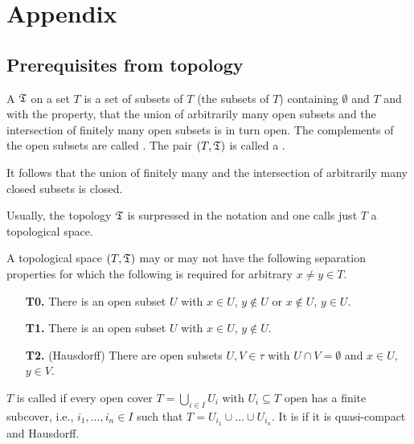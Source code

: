 \documentclass[a4paper,parskip=half,numbers=enddot, DIV=12]{scrreprt}
\begin{document}
	\appendix
	\chapter{Appendix}
	\setcounter{thm}{0}
	\renewcommand*{\thethm}{\Alph{thm}}
	\section{Prerequisites from topology}
	\begin{defi}
		A  $\mathfrak{T}$ on a set $T$ is a set of subsets of $T$ (the  subsets of $T$) containing $\emptyset$ and $T$ and with the property, that the union of arbitrarily many open subsets and the intersection of finitely many open subsets is in turn open. The complements of the open subsets are called . The pair $(T,\mathfrak{T})$ is called a .
	\end{defi}
	\begin{rem*}
		\begin{alphanumerate}
			\item It follows that the union of finitely many and the intersection of arbitrarily many closed subsets is closed.
			\item Usually, the topology $\mathfrak{T}$ is surpressed in the notation and one calls just $T$ a topological space.
		\end{alphanumerate}
	\end{rem*}
	\begin{defi}
		A topological space $(T,\mathfrak{T})$ may or may not have the following separation properties for which the following is required for arbitrary $x\neq y\in T$.
		\begin{itemize}
			\item [\textbf{T0.}] There is an open subset $U$ with $x\in U$, $y\not\in U$ or $x\not\in U$, $y\in U$.
			\item[\textbf{T1.}] There is an open subset $U$ with $x\in U$, $y\not\in U$.
			\item[\textbf{T2.}](Hausdorff) There are open subsets $U,V\in\tau$ with $U\cap V =\emptyset$ and $x\in U$, $y\in V$. 
		\end{itemize}
	\end{defi}
	\begin{defi}[Compactness]
		$T$ is called  if every open cover $T=\bigcup_{i\in I}U_i$ with $U_i\subseteq T$ open has a finite subcover, i.e., $i_1,\ldots,i_n\in I$ such that $T=U_{i_1}\cup\ldots\cup U_{i_n}$. It is  if it is quasi-compact and Hausdorff. 
	\end{defi}
\end{document}
